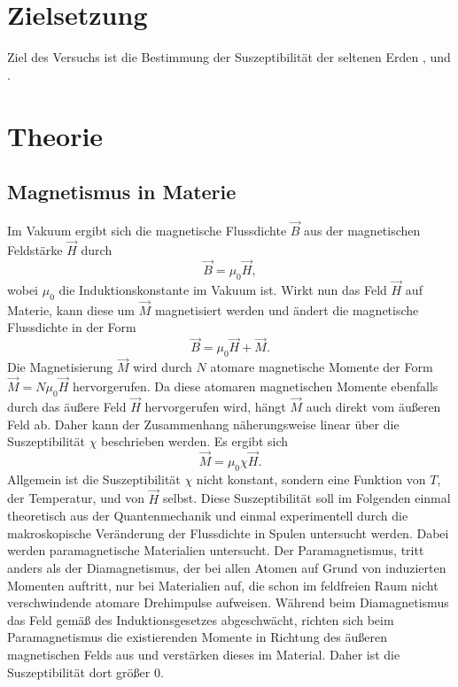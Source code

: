 \section{Zielsetzung}
Ziel des Versuchs ist die Bestimmung der Suszeptibilität der seltenen Erden
, und .
\section{Theorie}
\label{sec:Theorie}
\subsection{Magnetismus in Materie}
Im Vakuum ergibt sich die magnetische Flussdichte $\vec{B}$ aus der magnetischen Feldstärke $\vec{H}$
durch 
\begin{equation}
    \vec{B}= \mu_0 \vec{H},
    \label{eq:BVakuum}
\end{equation}
wobei $\mu_0$ die Induktionskonstante im Vakuum ist.
Wirkt nun das Feld $\vec{H}$ auf Materie, kann diese um $\vec{M}$ magnetisiert werden und ändert
die magnetische Flussdichte in der Form
\begin{equation}
    \vec{B}= \mu_0 \vec{H}+\vec{M}.
    \label{eq:BMaterie}
\end{equation}
Die Magnetisierung $\vec{M}$ wird durch $N$ atomare magnetische Momente der Form 
$\vec{M}=N\mu_0 \vec{H}$ hervorgerufen. Da diese atomaren magnetischen Momente ebenfalls durch 
das äußere Feld $\vec{H}$ hervorgerufen wird, hängt $\vec{M}$ auch direkt vom äußeren Feld ab.
Daher kann der Zusammenhang näherungsweise linear über die Suszeptibilität $\chi$ beschrieben werden.
Es ergibt sich
\begin{equation}
    \vec{M}= \mu_0 \chi \vec{H}.
    \label{eq:MMakro}
\end{equation}
Allgemein ist die Suszeptibilität $\chi$ nicht konstant, sondern eine Funktion von $T$, der Temperatur, und von $\vec{H}$ selbst.
Diese Suszeptibilität soll im Folgenden einmal theoretisch aus der Quantenmechanik und einmal experimentell
durch die makroskopische Veränderung der Flussdichte in Spulen untersucht werden.
Dabei werden paramagnetische Materialien untersucht. Der Paramagnetismus,
tritt anders als der Diamagnetismus, der bei allen Atomen auf Grund von induzierten Momenten 
auftritt, nur bei Materialien auf, die schon im feldfreien Raum nicht verschwindende atomare
Drehimpulse aufweisen. Während beim Diamagnetismus das Feld gemäß des Induktionsgesetzes abgeschwächt,
richten sich beim Paramagnetismus die existierenden Momente in Richtung des äußeren magnetischen 
Felds aus und verstärken dieses im Material. Daher ist die Suszeptibilität dort größer 0.
